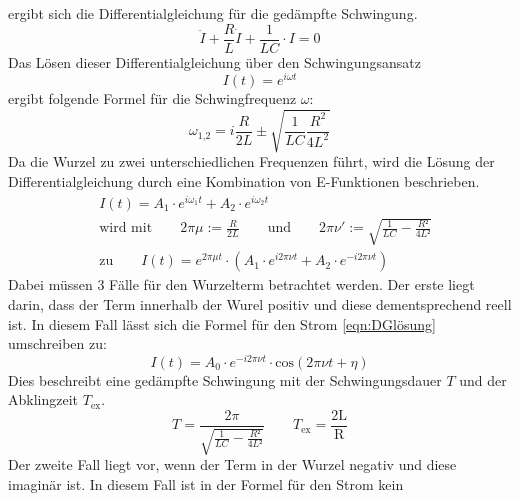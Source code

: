\documentclass[titlepage = firstcover]{scrartcl}
\begin{document}
            ergibt sich die Differentialgleichung für die gedämpfte Schwingung.
            \begin{equation}
                \ddot{I} + \frac{R}{L} \dot{I} + \frac{1}{LC} \cdot I = 0
            \end{equation}
            Das Lösen dieser Differentialgleichung über den Schwingungsansatz
            \begin{equation*}
                I(t) = e^{i\omega t}
            \end{equation*} 
            ergibt folgende Formel für die Schwingfrequenz $\omega$:
            \begin{equation}
                \omega_{\text{1,2}} = i\frac{R}{2L} \pm \sqrt{\frac{1}{LC}\frac{R^2}{4L^2}}
                \label{eqn:omega}
            \end{equation}
            Da die Wurzel zu zwei unterschiedlichen Frequenzen führt, wird die Lösung der Differentialgleichung durch eine Kombination von E-Funktionen
            beschrieben.
            \begin{align}
                &I(t) = A_1 \cdot e^{i\omega_1 t} + A_2 \cdot e^{i \omega_2 t} \\
                &\text{wird mit} \qquad 2\pi\mu := \frac{R}{2L} \qquad \text{und} \qquad 2\pi\nu ' := \sqrt{\frac{1}{LC}-\frac{R²}{4L²}} \\
                &\text{zu} \qquad I(t) = e^{2\pi\mu t} \cdot (A_1 \cdot e^{i2\pi\nu t} + A_2 \cdot e^{-i2\pi\nu t})
                \label{eqn:DGlösung}
            \end{align}
            Dabei müssen 3 Fälle für den Wurzelterm betrachtet werden. Der erste liegt darin, dass der Term innerhalb der Wurel positiv und diese 
            dementsprechend reell ist. In diesem Fall lässt sich die Formel für den Strom \ref{eqn:DGlösung} umschreiben zu:
            \begin{equation}
                I(t) = A_0 \cdot e^{-i2\pi\nu t} \cdot \text{cos}(2\pi\nu t + \eta)
            \end{equation}
            Dies beschreibt eine gedämpfte Schwingung mit der Schwingungsdauer $T$ und der Abklingzeit $T_{\text{ex}}$.
            \begin{equation}
                T = \frac{2\pi}{\sqrt{\frac{1}{LC}-\frac{R²}{4L²}}} \qquad T_{\text{ex}} = \frac{\text{2L}}{\text{R}}
                \label{eqn:Tpositiv}
            \end{equation}
            Der zweite Fall liegt vor, wenn der Term in der Wurzel negativ und diese imaginär ist. In diesem Fall ist in der Formel für den Strom kein 
\end{document}
